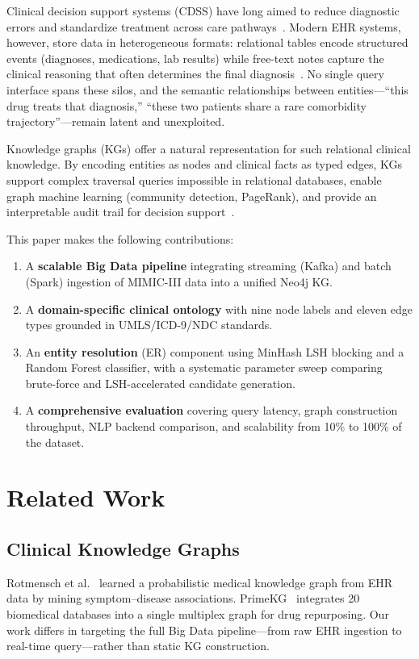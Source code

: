 \documentclass[conference]{IEEEtran}
\begin{document}
Clinical decision support systems (CDSS) have long aimed to reduce diagnostic
errors and standardize treatment across care pathways~\cite{berner2007clinical}.
Modern EHR systems, however, store data in heterogeneous formats: relational
tables encode structured events (diagnoses, medications, lab results) while
free-text notes capture the clinical reasoning that often determines the
final diagnosis~\cite{mimic3}.
No single query interface spans these silos, and the semantic relationships
between entities---``this drug treats that diagnosis,''
``these two patients share a rare comorbidity trajectory''---remain latent
and unexploited.

Knowledge graphs (KGs) offer a natural representation for such relational
clinical knowledge.
By encoding entities as nodes and clinical facts as typed edges, KGs support
complex traversal queries impossible in relational databases, enable graph
machine learning (community detection, PageRank), and provide an
interpretable audit trail for decision support~\cite{rotmensch2017learning}.

This paper makes the following contributions:
\begin{enumerate}
  \item A \textbf{scalable Big Data pipeline} integrating streaming (Kafka)
        and batch (Spark) ingestion of MIMIC-III data into a unified Neo4j KG.
  \item A \textbf{domain-specific clinical ontology} with nine node labels and
        eleven edge types grounded in UMLS/ICD-9/NDC standards.
  \item An \textbf{entity resolution} (ER) component using MinHash LSH blocking
        and a Random Forest classifier, with a systematic parameter sweep
        comparing brute-force and LSH-accelerated candidate generation.
  \item A \textbf{comprehensive evaluation} covering query latency, graph
        construction throughput, NLP backend comparison, and scalability
        from 10\% to 100\% of the dataset.
\end{enumerate}

\section{Related Work}

\subsection{Clinical Knowledge Graphs}
Rotmensch et al.~\cite{rotmensch2017learning} learned a probabilistic medical
knowledge graph from EHR data by mining symptom--disease associations.
PrimeKG~\cite{chandak2023primekg} integrates 20 biomedical databases into a
single multiplex graph for drug repurposing.
Our work differs in targeting the full Big Data pipeline---from raw EHR ingestion
to real-time query---rather than static KG construction.
\end{document}
